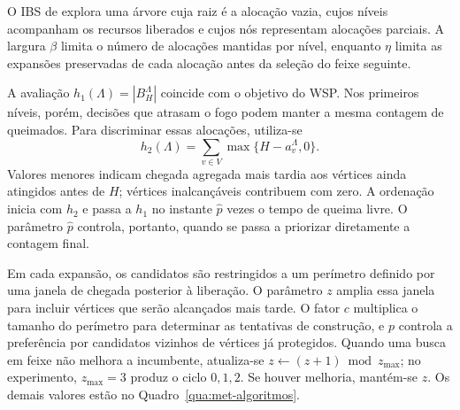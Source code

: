 O IBS de  explora uma árvore cuja raiz é a
alocação vazia, cujos níveis acompanham os recursos liberados e cujos nós
representam alocações parciais. A largura $\beta$ limita o número de
alocações mantidas por nível, enquanto $\eta$ limita as expansões
preservadas de cada alocação antes da seleção do feixe seguinte.

A avaliação $h_1(\Lambda)=|B_H^{\Lambda}|$ coincide com o objetivo do WSP.
Nos primeiros níveis, porém, decisões que atrasam o fogo podem manter a
mesma contagem de queimados. Para discriminar essas alocações, utiliza-se
\begin{equation}
 h_2(\Lambda)=\sum_{v\in V}\max\{H-a_v^{\Lambda},0\}.
 \label{eq:ibs-h2}
\end{equation}
\noindent Valores menores indicam chegada agregada mais tardia aos
vértices ainda atingidos antes de $H$; vértices inalcançáveis contribuem
com zero. A ordenação inicia com $h_2$ e passa a $h_1$ no instante
$\hat p$ vezes o tempo de queima livre. O parâmetro $\hat p$ controla,
portanto, quando se passa a priorizar diretamente a contagem final.

Em cada expansão, os candidatos são restringidos a um perímetro definido
por uma janela de chegada posterior à liberação. O parâmetro $z$ amplia
essa janela para incluir vértices que serão alcançados mais tarde.
O fator $c$ multiplica o tamanho do perímetro para determinar as tentativas
de construção, e $p$ controla a preferência por candidatos vizinhos de
vértices já protegidos. Quando uma busca em feixe não melhora a incumbente,
atualiza-se $z\leftarrow(z+1)\bmod z_{\max}$; no experimento,
$z_{\max}=3$ produz o ciclo $0,1,2$. Se houver melhoria, mantém-se $z$.
Os demais valores estão no Quadro~\ref{qua:met-algoritmos}.

